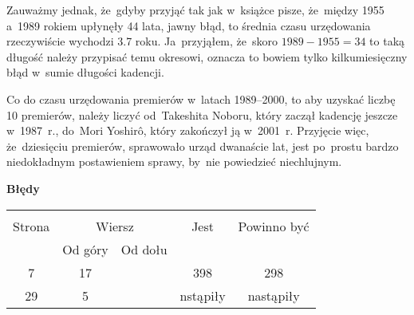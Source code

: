 \documentclass[a4paper,11pt]{article}
\newcommand{\tb}{\textbf}
\newcommand{\Center}[1]{\begin{center} #1 \end{center}}
\newcommand{\CenterTB}[1]{\Center{\tb{#1}}}
\begin{document}
Zauważmy jednak, że~gdyby przyjąć tak jak w~książce pisze, że~między
1955 a~1989 rokiem upłynęły 44 lata, jawny błąd, to średnia czasu
urzędowania rzeczywiście wychodzi 3.7 roku. Ja~przyjąłem, że~skoro
$1989 - 1955 = 34$ to taką długość należy przypisać temu okresowi,
oznacza to bowiem tylko kilkumiesięczny błąd w~sumie długości
kadencji.

Co do czasu urzędowania premierów w~latach 1989--2000, to aby uzyskać
liczbę 10 premierów, należy liczyć od~Takeshita Noboru, który zaczął
kadencję jeszcze w~1987~r., do~Mori Yoshir\^{o}, który zakończył ją
w~2001~r. Przyjęcie więc, że~dziesięciu premierów, sprawowało urząd
dwanaście lat, jest po~prostu bardzo niedokładnym postawieniem sprawy,
by~nie powiedzieć niechlujnym.

\CenterTB{Błędy}
\begin{center}
  \begin{tabular}{|c|c|c|c|c|}
    \hline
    & \multicolumn{2}{c|}{} & & \\
    Strona & \multicolumn{2}{c|}{Wiersz}& Jest & Powinno być \\ \cline{2-3}
    & Od góry & Od dołu &  &  \\
    \hline
    7 & 17 & & 398 & 298 \\
    29 & 5 & & nstąpiły & nastąpiły \\
    \hline
  \end{tabular}


\end{center}
\end{document}
